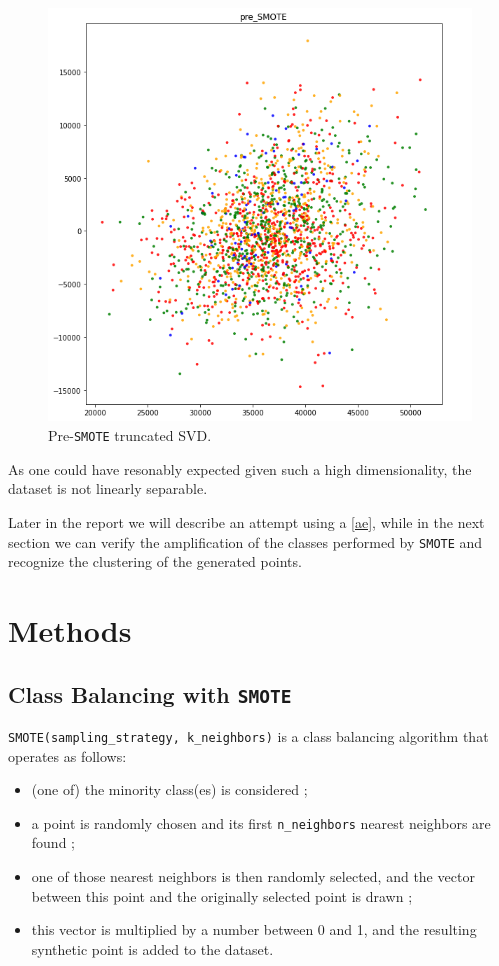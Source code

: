 \documentclass[aps,twocolumn,secnumarabic,nobalancelastpage,amsmath,amssymb,
nofootinbib]{revtex4}
\begin{document}
\begin{figure}
	\centering
	\includegraphics[width=0.7\linewidth]{Images/TruncatedSVD_preSMOTE}
	\caption{Pre-\texttt{SMOTE} truncated SVD.}
	\label{fig:pre-smote}
\end{figure}


As one could have resonably expected given such a high dimensionality,
the dataset is not linearly separable. \newline

Later in the report we will describe an attempt using a
\ref{ae}, while in the next section we can verify the amplification of the classes performed by \texttt{SMOTE} and recognize the clustering of the generated points.

\section{Methods}\label{methods}

\subsection{Class Balancing with
		\texttt{SMOTE}\label{smote}}

\texttt{SMOTE(sampling\_strategy,\ k\_neighbors)} is a class balancing
algorithm that operates as follows:

\begin{itemize}

\item
(one of) the minority class(es) is considered ;
\vspace{-0.2cm}\item
a point is randomly chosen and its first \texttt{n\_neighbors} nearest
neighbors are found ;
\vspace{-0.2cm}\item
one of those nearest neighbors is then randomly selected, and the
vector between this point and the originally selected point is drawn ;
\vspace{-0.2cm}\item
this vector is multiplied by a number between 0 and 1, and the
resulting synthetic point is added to the dataset.
\end{itemize}
\end{document}
